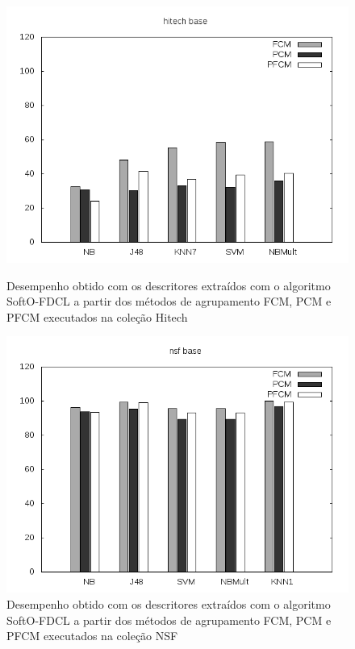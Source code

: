 \begin{figure}[!htp] \centering 
   \begin{minipage}{0.45\textwidth} 
     \centering
    \includegraphics[width=1.0\columnwidth]{assets/pfcm/hitech} 
    \caption{Desempenho obtido com os descritores extraídos com o algoritmo SoftO-FDCL a partir dos
      métodos de agrupamento FCM,
    PCM e PFCM executados na coleção Hitech} 
  \label{fig:pfcmhitech}
  \end{minipage}\hfill 
  \begin{minipage}{0.45\textwidth} \centering
    \includegraphics[width=1.0\columnwidth]{assets/pfcm/nsf} 
    \caption{Desempenho obtido com os descritores extraídos com o algoritmo SoftO-FDCL a partir dos
      métodos de agrupamento FCM,
    PCM e PFCM executados na coleção NSF} 
     \label{fig:pfcmnsf} 
   \end{minipage} 
\end{figure}

